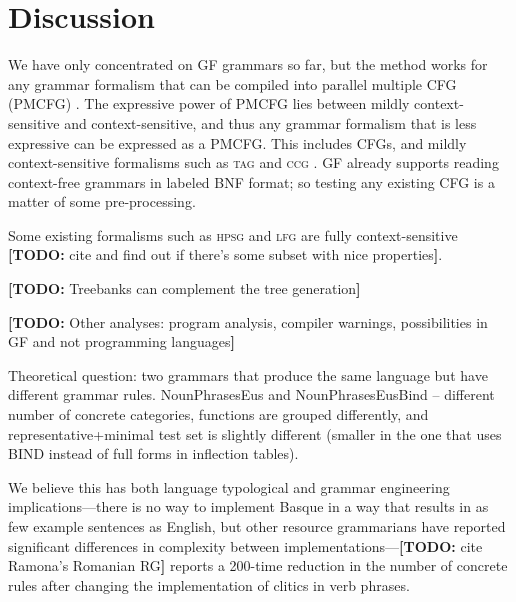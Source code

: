 \documentclass[11pt]{article}
\def\lfg{\textsc{lfg}}
\def\ccg{\textsc{ccg}}
\def\tag{\textsc{tag}}
\def\hpsg{\textsc{hpsg}}
\newcommand{\todo}[1]{{\color{cyan}\textbf{[TODO: }#1\textbf{]}}}
\begin{document}
\section{Discussion}

We have only concentrated on GF grammars so far, but the method works
for any grammar formalism that can be compiled into parallel
multiple CFG (PMCFG) \cite{seki91pmcfg}. The expressive power of PMCFG lies
between mildly context-sensitive and context-sensitive, and thus any
grammar formalism that is less expressive can be expressed as a
PMCFG. This includes CFGs, and mildly context-sensitive formalisms
such as \tag{} \cite{joshi1975tag} and \ccg{} \cite{steedman1988ccg}. GF
already supports reading context-free grammars in labeled BNF format;
so testing any existing CFG is a matter of some pre-processing.

Some existing formalisms such as \hpsg{} and \lfg{} are fully
context-sensitive \todo{cite and find out if there's some subset with
  nice properties}.

\todo{Treebanks can complement the tree generation}

\todo{Other analyses: program analysis, compiler warnings,
  possibilities in GF and not programming languages}

Theoretical question: two grammars that produce the same language but
have different grammar rules.
NounPhrasesEus and NounPhrasesEusBind -- different number of concrete
categories, functions are grouped differently, and
representative+minimal test set is slightly different (smaller in the
one that uses BIND instead of full forms in inflection tables).

We believe this has both language typological and grammar engineering
implications---there is no way to implement Basque in a way that
results in as few example sentences as English, but other resource
grammarians have reported significant differences in complexity
between implementations---\todo{cite Ramona's Romanian RG} reports a
200-time reduction in the number of concrete rules after changing the
implementation of clitics in verb phrases.






\end{document}
